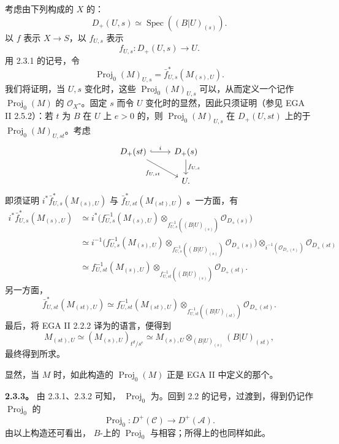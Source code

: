 考虑由下列构成的 $X$ 的：
\[
D_+(U,s)\simeq\operatorname{Spec}((B|U)_{(s)}).
\]
以 $f$ 表示 $X\to S$，以 $f_{U,s}$ 表示
\[
f_{U,s}:D_+(U,s)\longrightarrow U.
\]
用 2.3.1 的记号，令
\[
\operatorname{Proj}_0(M)_{U,s}=\bar f_{U,s}^*(M_{(s),U}).
\]
我们将证明，当 $U,s$ 变化时，这些 $\operatorname{Proj}_0(M)_{U,s}$ 可以，从而定义一个记作 $\operatorname{Proj}_0(M)$ 的 $\mathcal O_X$-。固定 $s$ 而令 $U$ 变化时的显然，因此只须证明（参见 EGA II 2.5.2）：若 $t$ 为 $B$ 在 $U$ 上 $e>0$ 的，则 $\operatorname{Proj}_0(M)_{U,s}$ 在 $D_+(U,st)$ 上的于 $\operatorname{Proj}_0(M)_{U,st}$。考虑
\[
\begin{tikzcd}
D_+(st)\arrow[r,hook,"i"]\arrow[dr,"{f_{U,st}}"']&D_+(s)\arrow[d,"{f_{U,s}}"]\\
&U.
\end{tikzcd}
\]
即须证明 $i^*\bar f_{U,s}^*(M_{(s),U})$ 与 $\bar f_{U,st}^*(M_{(st),U})$ 。一方面，有
\[
\begin{aligned}
i^*\bar f_{U,s}^*(M_{(s),U})
&\simeq i^*\bigl(f_{U,s}^{-1}(M_{(s),U})
\otimes_{f_{U,s}^{-1}((B|U)_{(s)})}\mathcal O_{D_+(s)}\bigr)\\
&\simeq i^{-1}\bigl(f_{U,s}^{-1}(M_{(s),U})
\otimes_{f_{U,s}^{-1}((B|U)_{(s)})}\mathcal O_{D_+(s)}\bigr)
\otimes_{i^{-1}(\mathcal O_{D_+(s)})}\mathcal O_{D_+(st)}\\
&\simeq f_{U,st}^{-1}(M_{(s),U})
\otimes_{f_{U,st}^{-1}((B|U)_{(s)})}\mathcal O_{D_+(st)}.
\end{aligned}
\]
另一方面，
\[
\bar f_{U,st}^*(M_{(st),U})\simeq
f_{U,st}^{-1}(M_{(st),U})
\otimes_{f_{U,st}^{-1}((B|U)_{(st)})}\mathcal O_{D_+(st)}.
\]
最后，将 EGA II 2.2.2 译为的语言，便得到
\[
M_{(st),U}\simeq(M_{(s),U})_{t^d/s^e}
\simeq M_{(s),U}\otimes_{(B|U)_{(s)}}(B|U)_{(st)},
\]
最终得到所求。

显然，当 $M$ 时，如此构造的 $\operatorname{Proj}_0(M)$ 正是 EGA II 中定义的那个。

\textbf{2.3.3。} 由 2.3.1、2.3.2 可知， $\operatorname{Proj}_0$ 为。回到 2.2 的记号，过渡到，得到仍记作 $\operatorname{Proj}_0$ 的
\[
\operatorname{Proj}_0:D^+(\mathscr C)\longrightarrow D^+(\mathscr A).
\]
由以上构造还可看出，
 $B$-上的 $\operatorname{Proj}_0$ 与相容；所得上的也同样如此。

